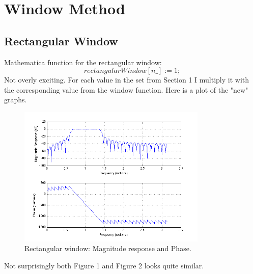\documentclass[a4wide,10pt]{article}
\begin{document}
	\newpage
	
	\section{Window Method} %
	\label{sec:window_method}
		\subsection{Rectangular Window} %
		\label{sub:rectangular_window}
			Mathematica function for the rectangular window:
			\begin{equation}
				rectangularWindow[n\_] := 1; \nonumber
			\end{equation}
			Not overly exciting. 
			For each value in the set from Section 1 I multiply it with the corresponding value from the window function. Here is a plot of the "new" graphs. 
			\begin{figure}[h]
				\centering
					\includegraphics[width=9cm]{images/opgave_2_a.png}
				\caption{Rectangular window: Magnitude response and Phase.}
				\label{fig:images_opgave_2_a}
			\end{figure}
			Not surprisingly both Figure 1 and Figure 2 looks quite similar.
		
\newpage		
\end{document}
